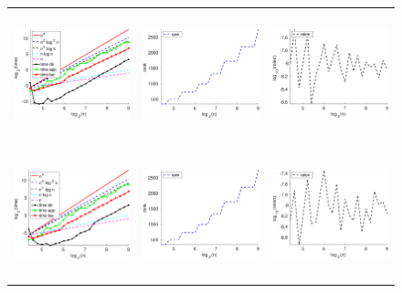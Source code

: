 \documentclass[11pt]{article}
\begin{document}
    \begin{figure}[ht!]
  \begin{center}
    \begin{tabular}{ccc}
      \includegraphics[height=1.45in]{pic/testJPT3D_time.eps}&
      \includegraphics[height=1.45in]{pic/testJPT3D_rank.eps}&
      \includegraphics[height=1.45in]{pic/testJPT3D_err.eps}\\
      \\
      \includegraphics[height=1.45in]{pic/testinvJPT3D_time.eps}&
      \includegraphics[height=1.45in]{pic/testinvJPT3D_rank.eps}&
      \includegraphics[height=1.45in]{pic/testinvJPT3D_err.eps}\\

\end{tabular}
\end{center}
\end{figure}
\end{document}
